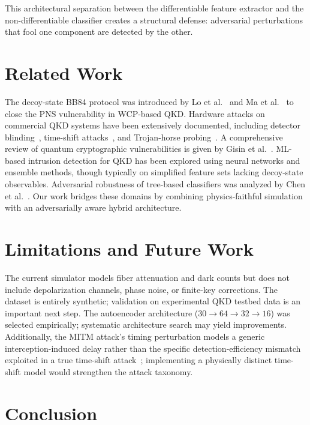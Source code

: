 \documentclass[conference]{IEEEtran}
\begin{document}
This architectural separation between the differentiable feature extractor and the non-differentiable classifier creates a structural defense: adversarial perturbations that fool one component are detected by the other.

\section{Related Work}

The decoy-state BB84 protocol was introduced by Lo et al.~\cite{lo2005decoy} and Ma et al.~\cite{ma2005practical} to close the PNS vulnerability in WCP-based QKD. Hardware attacks on commercial QKD systems have been extensively documented, including detector blinding~\cite{lydersen2010hacking}, time-shift attacks~\cite{qi2007time}, and Trojan-horse probing~\cite{jain2014trojan}. A comprehensive review of quantum cryptographic vulnerabilities is given by Gisin et al.~\cite{gisin2002quantum}. ML-based intrusion detection for QKD has been explored using neural networks and ensemble methods, though typically on simplified feature sets lacking decoy-state observables. Adversarial robustness of tree-based classifiers was analyzed by Chen et al.~\cite{chen2019robust}. Our work bridges these domains by combining physics-faithful simulation with an adversarially aware hybrid architecture.

\section{Limitations and Future Work}

The current simulator models fiber attenuation and dark counts but does not include depolarization channels, phase noise, or finite-key corrections. The dataset is entirely synthetic; validation on experimental QKD testbed data is an important next step. The autoencoder architecture ($30 \to 64 \to 32 \to 16$) was selected empirically; systematic architecture search may yield improvements. Additionally, the MITM attack's timing perturbation models a generic interception-induced delay rather than the specific detection-efficiency mismatch exploited in a true time-shift attack~\cite{qi2007time}; implementing a physically distinct time-shift model would strengthen the attack taxonomy.

\section{Conclusion}
\end{document}
